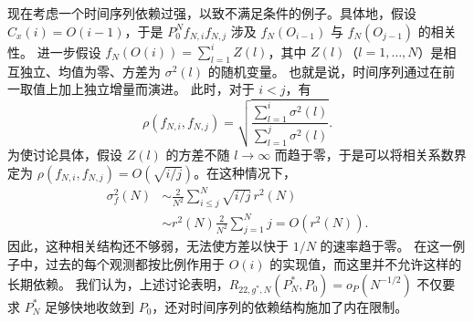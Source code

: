 现在考虑一个时间序列依赖过强，以致不满足条件的例子。具体地，假设
$C_x(i)=O(i-1)$，于是 $P_0^Nf_{N,i}f_{N,j}$ 涉及 $f_N(O_{i-1})$ 与 $f_N(O_{j-1})$ 的相关性。
进一步假设 $f_N(O(i))=\sum_{l=1}^iZ(l)$，其中 $Z(l)$（$l=1,\ldots,N$）是相互独立、均值为零、方差为 $\sigma^2(l)$ 的随机变量。
也就是说，时间序列通过在前一取值上加上独立增量而演进。
此时，对于 $i<j$，有
\[
\rho(f_{N,i},f_{N,j})
 =\sqrt{\frac{\sum_{l=1}^i\sigma^2(l)}{\sum_{l=1}^j\sigma^2(l)}}.
\]
为使讨论具体，假设 $Z(l)$ 的方差不随 $l\to\infty$ 而趋于零，于是可以将相关系数界定为
$\rho(f_{N,i},f_{N,j})=O(\sqrt{i/j})$。在这种情况下，
\[
\begin{aligned}
\sigma_f^2(N)
&\sim\frac2{N^2}\sum_{i\le j}^{N}\sqrt{i/j}\,r^2(N)\\
&\sim r^2(N)\frac2{N^2}\sum_{j=1}^Nj
 =O(r^2(N)).
\end{aligned}
\]
因此，这种相关结构还不够弱，无法使方差以快于 $1/N$ 的速率趋于零。
在这一例子中，过去的每个观测都按比例作用于 $O(i)$ 的实现值，而这里并不允许这样的长期依赖。
我们认为，上述讨论表明，$R_{22,g^*,N}(P_N^*,P_0)=o_P(N^{-1/2})$ 不仅要求 $P_N^*$ 足够快地收敛到 $P_0$，还对时间序列的依赖结构施加了内在限制。
